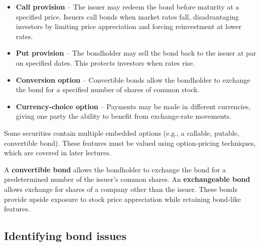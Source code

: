 \documentclass[
  letterpaper,
  DIV=11,
  numbers=noendperiod]{scrartcl}
\providecommand{\tightlist}{%
  \setlength{\itemsep}{0pt}\setlength{\parskip}{0pt}}
\begin{document}
\begin{itemize}
\tightlist
\item
  \textbf{Call provision} -- The issuer may redeem the bond before
  maturity at a specified price. Issuers call bonds when market rates
  fall, disadvantaging investors by limiting price appreciation and
  forcing reinvestment at lower rates.\\
\item
  \textbf{Put provision} -- The bondholder may sell the bond back to the
  issuer at par on specified dates. This protects investors when rates
  rise.
\item
  \textbf{Conversion option} -- Convertible bonds allow the bondholder
  to exchange the bond for a specified number of shares of common stock.
\item
  \textbf{Currency‑choice option} -- Payments may be made in different
  currencies, giving one party the ability to benefit from exchange‑rate
  movements.
\end{itemize}

Some securities contain multiple embedded options (e.g., a callable,
putable, convertible bond). These features must be valued using
option‑pricing techniques, which are covered in later lectures.

\begin{tcolorbox}[enhanced jigsaw, titlerule=0mm, rightrule=.15mm, bottomtitle=1mm, colframe=quarto-callout-note-color-frame, opacitybacktitle=0.6, coltitle=black, breakable, toprule=.15mm, title=\textcolor{quarto-callout-note-color}{\faInfo}\hspace{0.5em}{Convertible and exchangeable bonds}, leftrule=.75mm, colbacktitle=quarto-callout-note-color!10!white, left=2mm, arc=.35mm, opacityback=0, toptitle=1mm, bottomrule=.15mm, colback=white]

A \textbf{convertible bond} allows the bondholder to exchange the bond
for a predetermined number of the issuer's common shares. An
\textbf{exchangeable bond} allows exchange for shares of a company other
than the issuer. These bonds provide upside exposure to stock price
appreciation while retaining bond‑like features.

\end{tcolorbox}

\subsection{Identifying bond issues}\label{identifying-bond-issues}
\end{document}
